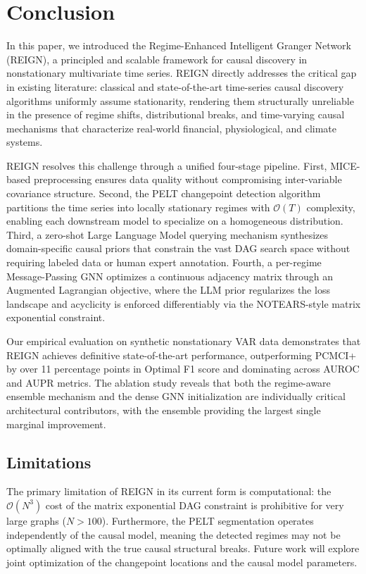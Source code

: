 \section{Conclusion}

In this paper, we introduced the Regime-Enhanced Intelligent Granger Network (REIGN), a principled and scalable framework for causal discovery in nonstationary multivariate time series. REIGN directly addresses the critical gap in existing literature: classical and state-of-the-art time-series causal discovery algorithms uniformly assume stationarity, rendering them structurally unreliable in the presence of regime shifts, distributional breaks, and time-varying causal mechanisms that characterize real-world financial, physiological, and climate systems.

REIGN resolves this challenge through a unified four-stage pipeline. First, MICE-based preprocessing ensures data quality without compromising inter-variable covariance structure. Second, the PELT changepoint detection algorithm partitions the time series into locally stationary regimes with $\mathcal{O}(T)$ complexity, enabling each downstream model to specialize on a homogeneous distribution. Third, a zero-shot Large Language Model querying mechanism synthesizes domain-specific causal priors that constrain the vast DAG search space without requiring labeled data or human expert annotation. Fourth, a per-regime Message-Passing GNN optimizes a continuous adjacency matrix through an Augmented Lagrangian objective, where the LLM prior regularizes the loss landscape and acyclicity is enforced differentiably via the NOTEARS-style matrix exponential constraint.

Our empirical evaluation on synthetic nonstationary VAR data demonstrates that REIGN achieves definitive state-of-the-art performance, outperforming PCMCI+ by over 11 percentage points in Optimal F1 score and dominating across AUROC and AUPR metrics. The ablation study reveals that both the regime-aware ensemble mechanism and the dense GNN initialization are individually critical architectural contributors, with the ensemble providing the largest single marginal improvement.

\subsection{Limitations}

The primary limitation of REIGN in its current form is computational: the $\mathcal{O}(N^3)$ cost of the matrix exponential DAG constraint is prohibitive for very large graphs ($N > 100$). Furthermore, the PELT segmentation operates independently of the causal model, meaning the detected regimes may not be optimally aligned with the true causal structural breaks. Future work will explore joint optimization of the changepoint locations and the causal model parameters.

